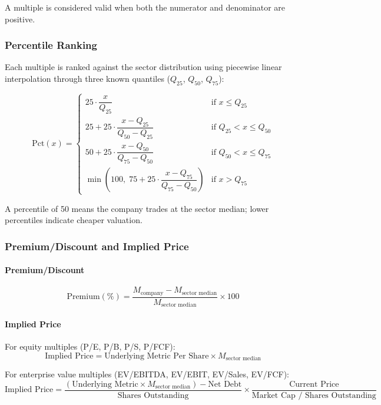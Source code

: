 A multiple is considered valid when both the numerator and denominator are positive.

\subsubsection{Percentile Ranking}

Each multiple is ranked against the sector distribution using piecewise linear interpolation through three known quantiles ($Q_{25}$, $Q_{50}$, $Q_{75}$):

\[
\text{Pct}(x) = \begin{cases}
25 \cdot \dfrac{x}{Q_{25}} & \text{if } x \leq Q_{25} \\[8pt]
25 + 25 \cdot \dfrac{x - Q_{25}}{Q_{50} - Q_{25}} & \text{if } Q_{25} < x \leq Q_{50} \\[8pt]
50 + 25 \cdot \dfrac{x - Q_{50}}{Q_{75} - Q_{50}} & \text{if } Q_{50} < x \leq Q_{75} \\[8pt]
\min\!\left(100, \; 75 + 25 \cdot \dfrac{x - Q_{75}}{Q_{75} - Q_{50}}\right) & \text{if } x > Q_{75}
\end{cases}
\]

A percentile of 50 means the company trades at the sector median; lower percentiles indicate cheaper valuation.

\subsubsection{Premium/Discount and Implied Price}

\paragraph{Premium/Discount}

\[
\text{Premium}(\%) = \frac{M_{\text{company}} - M_{\text{sector median}}}{M_{\text{sector median}}} \times 100
\]

\paragraph{Implied Price}

For equity multiples (P/E, P/B, P/S, P/FCF):
\[
\text{Implied Price} = \text{Underlying Metric Per Share} \times M_{\text{sector median}}
\]

For enterprise value multiples (EV/EBITDA, EV/EBIT, EV/Sales, EV/FCF):
\[
\text{Implied Price} = \frac{(\text{Underlying Metric} \times M_{\text{sector median}}) - \text{Net Debt}}{\text{Shares Outstanding}} \times \frac{\text{Current Price}}{\text{Market Cap / Shares Outstanding}}
\]

